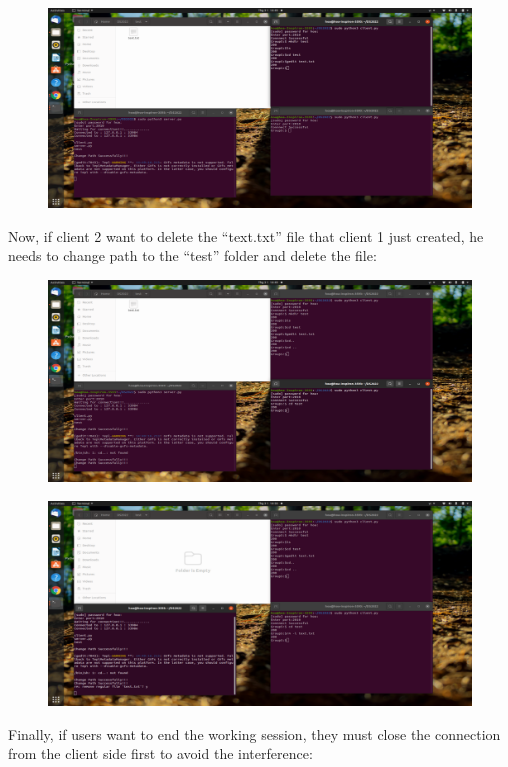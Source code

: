 \begin{figure}[h]
\centering
\includegraphics{images/result_6.png}
\end{figure}
\newpage

\hspace{0.7cm} Now, if client 2 want to delete the “text.txt” file that client 1 just created, he needs to change path to the “test” folder and delete the file:
\begin{figure}[h]
\centering
\includegraphics{images/result_7.png}
\end{figure}

\begin{figure}[h]
\centering
\includegraphics{images/result_8.png}
\end{figure}
\newpage
\hspace{0.7cm} Finally, if users want to end the working session, they must close the connection from the client side first to avoid the interference:

